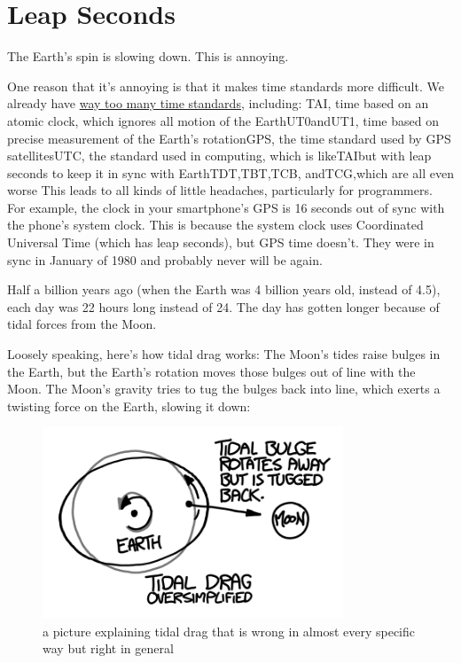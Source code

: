 {
\chapter{Leap Seconds}
}

\hfill{}

{The Earth’s spin is slowing down. This is annoying.}

{One reason that it’s annoying is that it makes time standards more difficult. We already have \href{http://tycho.usno.navy.mil/systime.html}{way too many time standards}, including:}
TAI, time based on an atomic clock, which ignores all motion of the EarthUT0andUT1, time based on precise measurement of the Earth’s rotationGPS, the time standard used by GPS satellitesUTC, the standard used in computing, which is likeTAIbut with leap seconds to keep it in sync with EarthTDT,TBT,TCB, andTCG,which are all even worse
{This leads to all kinds of little headaches, particularly for programmers. For example, the clock in your smartphone’s GPS is 16 seconds out of sync with the phone’s system clock. This is because the system clock uses Coordinated Universal Time (which has leap seconds), but GPS time doesn’t. They were in sync in January of 1980 and probably never will be again.}

{Half a billion years ago (when the Earth was 4 billion years old, instead of 4.5), each day was 22 hours long instead of 24. The day has gotten longer because of tidal forces from the Moon.}

{Loosely speaking, here’s how tidal drag works: The Moon’s tides raise bulges in the Earth, but the Earth’s rotation moves those bulges out of line with the Moon. The Moon’s gravity tries to tug the bulges back into line, which exerts a twisting force on the Earth, slowing it down:}

\begin{figure}[!htbp]
\centering
\includegraphics[scale=0.5, max width=0.8\textwidth]{imgs/a/26/leap_tides.png}
\caption{a picture explaining tidal drag that is wrong in almost every specific way but right in general}
\end{figure}

